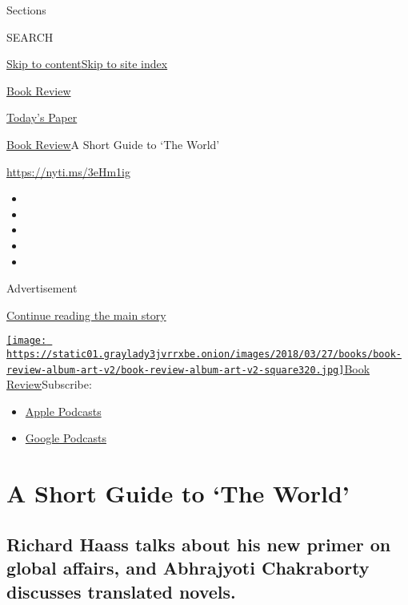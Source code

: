 Sections

SEARCH

\protect\hyperlink{site-content}{Skip to
content}\protect\hyperlink{site-index}{Skip to site index}

\href{https://www.nytimes3xbfgragh.onion/section/books/review}{Book
Review}

\href{https://myaccount.nytimes3xbfgragh.onion/auth/login?response_type=cookie\&client_id=vi}{}

\href{https://www.nytimes3xbfgragh.onion/section/todayspaper}{Today's
Paper}

\href{/section/books/review}{Book Review}\textbar{}A Short Guide to `The
World'

\href{https://nyti.ms/3eHm1ig}{https://nyti.ms/3eHm1ig}

\begin{itemize}
\item
\item
\item
\item
\item
\end{itemize}

Advertisement

\protect\hyperlink{after-top}{Continue reading the main story}

\href{https://www.nytimes3xbfgragh.onion/column/book-review-podcast}{\texttt{[image: https://static01.graylady3jvrrxbe.onion/images/2018/03/27/books/book-review-album-art-v2/book-review-album-art-v2-square320.jpg]}Book
Review}Subscribe:

\begin{itemize}
\tightlist
\item
  \href{https://itunes.apple.com/us/podcast/id120315179}{Apple Podcasts}
\item
  \href{https://www.google.com/podcasts?feed=aHR0cHM6Ly9yc3MuYXJ0MTkuY29tL2Jvb2stcmV2aWV3}{Google
  Podcasts}
\end{itemize}

\hypertarget{a-short-guide-to-the-world}{%
\section{A Short Guide to `The
World'}\label{a-short-guide-to-the-world}}

\hypertarget{richard-haass-talks-about-his-new-primer-on-global-affairs-and-abhrajyoti-chakraborty-discusses-translated-novels}{%
\subsection{Richard Haass talks about his new primer on global affairs,
and Abhrajyoti Chakraborty discusses translated
novels.}\label{richard-haass-talks-about-his-new-primer-on-global-affairs-and-abhrajyoti-chakraborty-discusses-translated-novels}}


